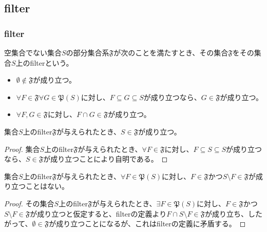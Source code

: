 \documentclass[dvipdfmx]{jsarticle}
\begin{document}
\subsection{filter}%
\subsubsection{filter}%
\begin{dfn}
空集合でない集合$S$の部分集合系$\mathfrak{F}$が次のことを満たすとき、その集合$\mathfrak{F}$をその集合$S$上のfilterという。
\begin{itemize}
\item
  $\emptyset \notin \mathfrak{F}$が成り立つ。
\item
  $\forall F \in \mathfrak{F}\forall G \in \mathfrak{P}(S)$に対し、$F \subseteq G \subseteq S$が成り立つなら、$G \in \mathfrak{F}$が成り立つ。
\item
  $\forall F,G \in \mathfrak{F}$に対し、$F \cap G \in \mathfrak{F}$が成り立つ。
\end{itemize}
\end{dfn}
\begin{thm}\label{8.1.8.1}
集合$S$上のfilter$\mathfrak{F}$が与えられたとき、$S \in \mathfrak{F}$が成り立つ。
\end{thm}
\begin{proof}
集合$S$上のfilter$\mathfrak{F}$が与えられたとき、$\forall F \in \mathfrak{F}$に対し、$F \subseteq S \subseteq S$が成り立つなら、$S \in \mathfrak{F}$が成り立つことにより自明である。
\end{proof}
\begin{thm}\label{8.1.8.2}
集合$S$上のfilter$\mathfrak{F}$が与えられたとき、$\forall F \in \mathfrak{P}(S)$に対し、$F \in \mathfrak{F}$かつ$S \setminus F \in \mathfrak{F}$が成り立つことはない。
\end{thm}
\begin{proof}
その集合$S$上のfilter$\mathfrak{F}$が与えられたとき、$\exists F \in \mathfrak{P}(S)$に対し、$F \in \mathfrak{F}$かつ$S \setminus F \in \mathfrak{F}$が成り立つと仮定すると、filterの定義より$F \cap S \setminus F \in \mathfrak{F}$が成り立ち、したがって、$\emptyset \in \mathfrak{F}$が成り立つことになるが、これはfilterの定義に矛盾する。
\end{proof}
\end{document}

